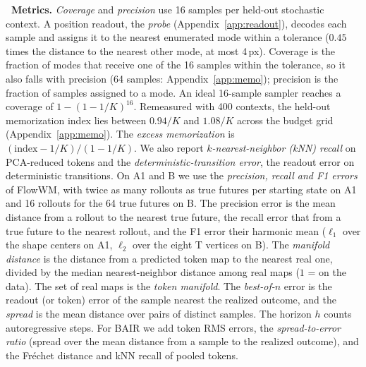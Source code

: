 \leavevmode{}\textbf{\thesubsection\ Metrics.} \emph{Coverage} and \emph{precision} use 16 samples per held-out stochastic context. A position readout, the \emph{probe} (Appendix~\ref{app:readout}), decodes each sample and assigns it to the nearest enumerated mode within a tolerance ($0.45$ times the distance to the nearest other mode, at most 4\,px). Coverage is the fraction of modes that receive one of the 16 samples within the tolerance, so it also falls with precision (64 samples: Appendix~\ref{app:memo}); precision is the fraction of samples assigned to a mode. An ideal 16-sample sampler reaches a coverage of $1 - (1-1/K)^{16}$. Remeasured with 400 contexts, the held-out memorization index lies between $0.94/K$ and $1.08/K$ across the budget grid (Appendix~\ref{app:memo}). The \emph{excess memorization} is $(\text{index} - 1/K)/(1-1/K)$. We also report \emph{$k$-nearest-neighbor (kNN) recall} \citep{kynkaanniemi2019improved} on PCA-reduced tokens and the \emph{deterministic-transition error}, the readout error on deterministic transitions. On A1 and B we use the \emph{precision, recall and F1 errors} of FlowWM, with twice as many rollouts as true futures per starting state on A1 and 16 rollouts for the 64 true futures on B. The precision error is the mean distance from a rollout to the nearest true future, the recall error that from a true future to the nearest rollout, and the F1 error their harmonic mean ($\ell_1$ over the shape centers on A1, $\ell_2$ over the eight T vertices on B). The \emph{manifold distance} is the distance from a predicted token map to the nearest real one, divided by the median nearest-neighbor distance among real maps ($1$ = on the data). The set of real maps is the \emph{token manifold}. The \emph{best-of-$n$} error is the readout (or token) error of the sample nearest the realized outcome, and the \emph{spread} is the mean distance over pairs of distinct samples. The horizon $h$ counts autoregressive steps. For BAIR we add token RMS errors, the \emph{spread-to-error ratio} (spread over the mean distance from a sample to the realized outcome), and the Fr\'echet distance and kNN recall of pooled tokens.

